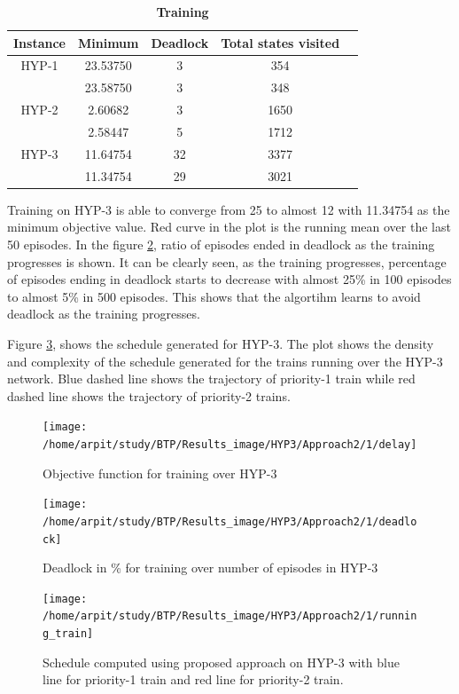 \begin{table}
    \centering
    \caption{\textbf{Training}}
    \label{Training}    
        \begin{tabular}{  c c c c c } 
         \hline
         \textbf{Instance} & \textbf{Minimum} & \textbf{Deadlock} & \textbf{Total states visited} \\ 
         \hline
         \hline
         HYP-1 & 23.53750 & 3 & 354 \\
         & 23.58750 & 3 & 348 \\
     
         HYP-2 & 2.60682 & 3 & 1650 \\
         & 2.58447 & 5 & 1712 \\
     
         HYP-3 & 11.64754 & 32 & 3377 \\
         & 11.34754 & 29 & 3021 \\
         \hline

        \end{tabular}
\end{table}
    

Training on HYP-3 is able to converge from 25 to almost 12 with 11.34754 as the minimum objective 
value. Red curve in the plot is the running mean over the last 50 episodes. In the figure \ref{deadlock_HYP-3}, ratio of 
episodes ended in deadlock as the training progresses is shown. It can be clearly seen, as the training 
progresses, percentage of episodes ending in deadlock starts to decrease with almost 25\% in 100 episodes 
to almost 5\% in 500 episodes. This shows that the algortihm learns to avoid deadlock as the training progresses. 

\vspace{\baselineskip}
Figure \ref{Schedule_HYP-3}, shows the schedule generated for HYP-3. The plot shows the density and complexity of the 
schedule generated for the trains running over the HYP-3 network. Blue dashed line shows the trajectory of 
priority-1 train while red dashed line shows the trajectory of priority-2 trains.


\begin{figure}[H]
    \centering
    \texttt{[image: /home/arpit/study/BTP/Results\_image/HYP3/Approach2/1/delay]}
    \caption{ Objective function for training over HYP-3 }
    \label{delay_HYP-3}
\end{figure}
\begin{figure}[H]
    \centering
    \texttt{[image: /home/arpit/study/BTP/Results\_image/HYP3/Approach2/1/deadlock]}
    \caption{ Deadlock in \% for training over number of episodes in HYP-3 }
    \label{deadlock_HYP-3}
\end{figure}
\begin{figure}[H]
    \centering
    \texttt{[image: /home/arpit/study/BTP/Results\_image/HYP3/Approach2/1/running\_train]}
    \caption{ Schedule computed using proposed approach on HYP-3 with blue line for priority-1 train 
              and red line for priority-2 train. }
    \label{Schedule_HYP-3}
\end{figure}
